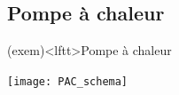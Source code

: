 \documentclass[../../main/main.tex]{subfiles}
\begin{document}
\subsection{Pompe à chaleur}
\begin{tcb}(exem)<lftt>{Pompe à chaleur}
	\begin{center}
		\texttt{[image: PAC\_schema]}
	\end{center}
\end{tcb}
\vspace{-15pt}
\end{document}
